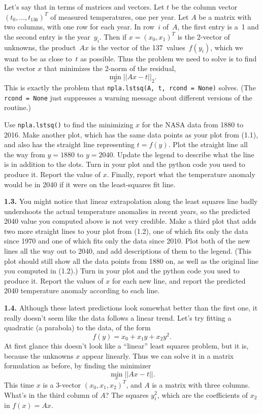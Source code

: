\documentclass[11pt]{article}
\begin{document}
Let's say that in terms of matrices and vectors.
Let $t$ be the column vector $(t_0,\ldots,t_{136})^T$ of measured temperatures,
one per year.
Let $A$ be a matrix with two columns, with one row for each year.
In row~$i$ of~$A$, the first entry is a~1 and the second entry is the year~$y_i$.
Then if $x=(x_0,x_1)^T$ is the 2-vector of unknowns, 
the product~$Ax$ is the vector of the 137~values~$f(y_i)$, which we want to be 
as close to~$t$ as possible.
Thus the problem we need to solve is to find the vector $x$ that minimizes
the 2-norm of the residual,
$$\min_x ||Ax - t||_2.$$
This is exactly the problem that {\tt npla.lstsq(A, t, rcond = None)} solves. 
(The {\tt rcond = None} just suppresses a warning message about different versions
of the routine.)

Use {\tt npla.lstsq()} to find the minimizing $x$ for the NASA data from 1880 to 2016.
Make another plot, which has the same data points as your plot from (1.1), 
and also has the straight line representing $t = f(y)$.
Plot the straight line all the way from $y=1880$ to $y=2040$.
Update the legend to describe what the line is in addition to the dots.
Turn in your plot and the python code you used to produce it.
Report the value of $x$.
Finally, report what the temperature anomaly would be in 2040 if it were on the least-squares fit line.

\par\medskip 
{\bf 1.3.}
You might notice that linear extrapolation along the least squares line badly undershoots the
actual temperature anomalies in recent years, so the predicted 2040 value you computed above
is not very credible.
Make a third plot that adds two more straight lines to your plot from (1.2),
one of which fits only the data since 1970 and one of which fits only the data since 2010.
Plot both of the new lines all the way out to 2040, and add descriptions of them to the legend.
(This plot should still show all the data points from 1880 on, 
as well as the original line you computed in (1.2).)
Turn in your plot and the python code you used to produce it.
Report the values of $x$ for each new line,
and report the predicted 2040 temperature anomaly according to each line.

\par\medskip 
{\bf 1.4.}
Although these latest predictions look somewhat better than the first one,
it really doesn't seem like the data follows a linear trend. 
Let's try fitting a quadratic (a parabola) to the data, of the form
$$f(y) = x_0 + x_1y + x_2y^2.$$
At first glance this doesn't look like a ``linear'' least squares problem,
but it is, because the unknowns $x$ appear linearly.
Thus we can solve it in a matrix formulation as before, by finding the minimizer
$$\min_x ||Ax - t||.$$
This time $x$ is a 3-vector $(x_0,x_1,x_2)^T$, and $A$ is a matrix with three columns.
What's in the third column of $A$? The squares $y_i^2$, 
which are the coefficients of $x_2$ in $f(x) = Ax$.
\end{document}
